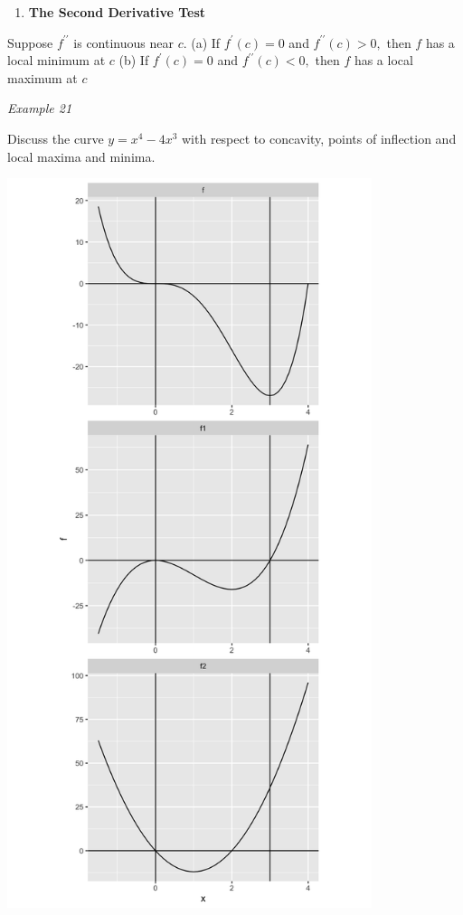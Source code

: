 \documentclass[]{book}
\providecommand{\tightlist}{%
  \setlength{\itemsep}{0pt}\setlength{\parskip}{0pt}}
\begin{document}
\begin{enumerate}
\def\labelenumi{\arabic{enumi}.}
\setcounter{enumi}{5}
\tightlist
\item
  \textbf{The Second Derivative Test}
\end{enumerate}

Suppose \(f^{\prime \prime}\) is continuous near \(c\).
(a) If \(f^\prime (c) = 0\) and \(f^{\prime \prime}(c) >0,\) then \(f\) has a local minimum at \(c\)
(b) If \(f^\prime (c) = 0\) and \(f^{\prime \prime}(c) <0,\) then \(f\) has a local maximum at \(c\)

\newpage

\emph{Example 21}

Discuss the curve \(y= x^4 - 4x^3\) with respect to concavity, points of inflection and local maxima and minima.

\newpage

\begin{center}\includegraphics[width=0.8\textwidth]{figure/unnamed-chunk-14-1} \end{center}
\end{document}
